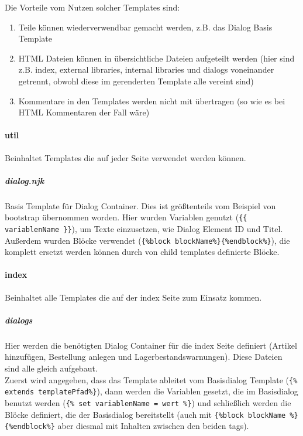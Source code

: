 \documentclass[12pt,pdftex,parskip=half]{scrartcl}
\begin{document}
        Die Vorteile vom Nutzen solcher Templates sind:

        \begin{enumerate}
            \item Teile können wiederverwendbar gemacht werden, z.B. das Dialog Basis Template
            \item HTML Dateien können in übersichtliche Dateien aufgeteilt werden (hier sind z.B. index, external libraries, internal libraries und dialogs voneinander getrennt, obwohl diese im gerenderten Template alle vereint sind)
            \item Kommentare in den Templates werden nicht mit übertragen (so wie es bei HTML Kommentaren der Fall wäre)
        \end{enumerate}



            \paragraph{util}
            Beinhaltet Templates die auf jeder Seite verwendet werden können.

                \subparagraph{dialog.njk}
                Basis Template für Dialog Container. Dies ist größtenteils vom Beispiel von bootstrap übernommen worden. Hier wurden Variablen genutzt (\lstinline|{{ variablenName }}|), um Texte einzusetzen, wie Dialog Element ID und Titel.
                Außerdem wurden Blöcke verwendet (\lstinline|{%block blockName%}{%endblock%}|), die komplett ersetzt werden können durch von child templates definierte Blöcke.

            \paragraph{index}
            Beinhaltet alle Templates die auf der index Seite zum Einsatz kommen.

                \subparagraph{dialogs}
                Hier werden die benötigten Dialog Container für die index Seite definiert (Artikel hinzufügen, Bestellung anlegen und Lagerbestandswarnungen). Diese Dateien sind alle gleich aufgebaut.\\
                Zuerst wird angegeben, dass das Template ableitet vom Basisdialog Template (\lstinline|{% extends templatePfad%}|), dann werden die Variablen gesetzt, die im Basisdialog benutzt werden (\lstinline|{% set variablenName = wert %}|) und schließlich werden die Blöcke definiert, die der Basisdialog bereitstellt (auch mit \lstinline|{%block blockName %}{%endblock%}| aber diesmal mit Inhalten zwischen den beiden tags).
\end{document}
